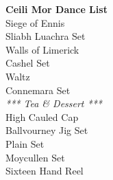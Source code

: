 \documentclass[letterpaper,17pt]{memoir}
\begin{document}
\begin{center}
\Huge{\textbf{Ceili Mor Dance List}\\}
\sffamily
\huge{
\vspace*{1.15em}Siege of Ennis \\
\vspace*{1em}Sliabh Luachra Set\\
\vspace*{1em}Walls of Limerick\\
\vspace*{1em}Cashel Set\\
\vspace*{1em}Waltz\\
\vspace*{1em}Connemara Set\\
\vspace*{1em}\textit{*** Tea \& Dessert ***}\\
\vspace*{1em}High Cauled Cap\\
\vspace*{1em}Ballvourney Jig Set\\
\vspace*{1em}Plain Set\\
\vspace*{1em}Moycullen Set\\
\vspace*{1em}Sixteen Hand Reel\\



}
\end{center}
\end{document}
